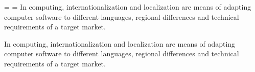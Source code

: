 \hsize 3in \vsize=1.4in  
\headline={\hrulefill} \footline={\hrulefill}
\noindent In computing, internationalization and localization
are means of adapting computer software to different
languages, regional differences and technical
requirements of a target market.

\noindent In computing, internationalization and localization
are means of adapting computer software to different
languages, regional differences and technical
requirements of a target market.
\bye
